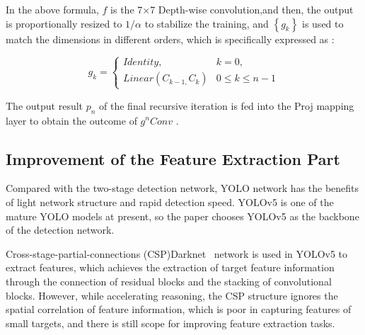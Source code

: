 \documentclass[sn-mathphys,Numbered]{sn-jnl}%
\theoremstyle{thmstyleone}%
\theoremstyle{thmstyletwo}%
\theoremstyle{thmstylethree}%
\begin{document}
In the above formula, $f$ is the 7×7 Depth-wise convolution,and then, the output is proportionally resized to $1/\alpha $ to stabilize the training, and $\left\{ {{g_k}} \right\}$ is used to match the dimensions in different orders, which is specifically expressed as :

\begin{equation}
{g_k} = \left\{ {\begin{array}{*{20}{c}}
{Identity,}&{k = 0,}\\
{Linear({C_{k - 1,}}{C_k})}&{0 \le k \le n - 1}
\end{array}} \right.    
\end{equation}

The output result ${p_n}$ of the final recursive iteration is fed into the Proj mapping layer to obtain the outcome of ${g^n}Conv$ .

\subsection{Improvement of the Feature Extraction Part}

Compared with the two-stage detection network, YOLO network has the benefits of light network structure and rapid detection speed. YOLOv5 is one of the mature YOLO models at present, so the paper chooses YOLOv5 as the backbone of the detection network.

Cross-stage-partial-connections (CSP)Darknet~\cite{wang2020cspnet}  network is used in YOLOv5 to extract features, which achieves the extraction of target feature information through the connection of residual blocks and the stacking of convolutional blocks. However, while accelerating reasoning, the CSP structure ignores the spatial correlation of feature information, which is poor in capturing features of small targets, and there is still scope for improving feature extraction tasks.
\end{document}
